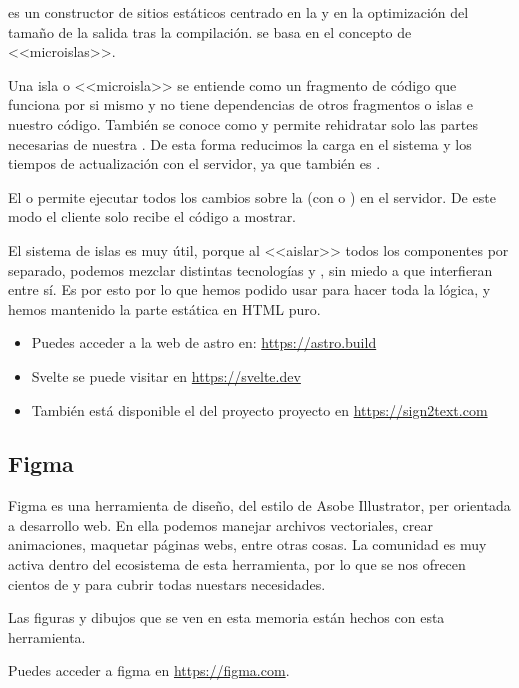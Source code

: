 es un constructor de sitios estáticos centrado en la  y en la optimización del tamaño de la salida tras la compilación.  se basa en el concepto de <<microislas>>.

Una isla o <<microisla>> se entiende como un fragmento de código que funciona por si mismo y no tiene dependencias de otros fragmentos o islas e nuestro código. También se conoce como  y permite rehidratar solo las partes necesarias de nuestra . De esta forma reducimos la carga en el sistema y los tiempos de actualización con el servidor, ya que también es .

El  o  permite ejecutar todos los cambios sobre la  (con  o ) en el servidor. De este modo el cliente solo recibe el código  a mostrar.

El sistema de islas es muy útil, porque al <<aislar>> todos los componentes por separado, podemos mezclar distintas tecnologías y , sin miedo a que interfieran entre sí. Es por esto por lo que hemos podido usar  para hacer toda la lógica, y hemos mantenido la parte estática en HTML puro.

\begin{itemize}
  \item Puedes acceder a la web de astro en: \url{https://astro.build}
  \item Svelte se puede visitar en \url{https://svelte.dev}
  \item También está disponible el  del proyecto proyecto en \url{https://sign2text.com}
\end{itemize}

\subsection{Figma}

Figma es una herramienta de diseño, del estilo de Asobe Illustrator, per orientada a desarrollo web. En ella podemos manejar archivos vectoriales, crear animaciones, maquetar páginas webs, entre otras cosas. La comunidad es muy activa dentro del ecosistema de esta herramienta, por lo que se nos ofrecen cientos de  y  para cubrir todas nuestars necesidades.

Las figuras y dibujos que se ven en esta memoria están hechos con esta herramienta.

Puedes acceder a figma en \url{https://figma.com}.

